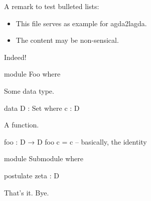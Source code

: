 

A remark to test bulleted lists:

\begin{itemize}

\item
This file serves as example for agda2lagda.

\item
The content may be non-sensical.

\end{itemize}

Indeed!

\begin{code}
module Foo where
\end{code}

Some data type.

\begin{code}
data D : Set where
  c : D
\end{code}

A function.

\begin{code}
foo : D → D
foo c = c   -- basically, the identity
\end{code}



\begin{code}
module Submodule where

  postulate
    zeta : D
\end{code}

That's it.
Bye.


